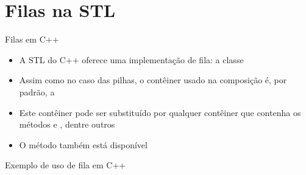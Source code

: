 \section{Filas na STL}

\begin{frame}[fragile]{Filas em C++}

    \begin{itemize}
        \item A STL do C++ oferece uma implementação de fila: a classe 

        \item Assim como no caso das pilhas, o contêiner usado na composição é, por padrão, a

        \item Este contêiner pode ser substituído por qualquer contêiner que contenha os métodos
             e , dentre outros

        \item O método  também está disponível
    \end{itemize}

\end{frame}

\begin{frame}[fragile]{Exemplo de uso de fila em C++}
\end{frame}
